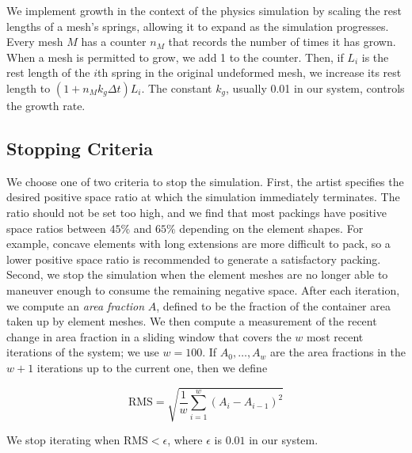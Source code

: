 We implement growth in the context of the physics simulation by scaling
the rest lengths of a mesh's springs, allowing it to expand as the simulation
progresses.  Every mesh $M$ has a counter $n_M$ that records the number of
times it has grown.  When a mesh is permitted
to grow, we add 1 to the counter.  Then, if $L_i$ is the rest length
of the $i$th spring in the original undeformed mesh, we increase its rest
length to $(1+n_Mk_g\Delta t)L_i$.  The constant $k_g$,
usually 0.01 in our system, controls the growth rate.


\subsection{Stopping Criteria}
\label{repulsionpak_stopping_criteria}


We choose one of two criteria to stop the simulation. First, the artist specifies 
the desired positive space ratio at which the simulation immediately terminates.
The ratio should not be set too high, and
we find that most packings have positive space ratios between $45\%$ and $65\%$ depending on the element shapes.
For example, concave elements with long extensions are more difficult to pack, 
so a lower positive space ratio is recommended to generate a satisfactory packing.
Second, we stop the simulation when the element meshes are no longer
able to maneuver enough to consume the remaining negative space. 
After each iteration, we compute an \textit{area fraction} $A$, defined to be the fraction of
the container area taken up by element meshes.  We then compute a measurement
of the recent change in area fraction in a sliding window that covers the $w$
most recent iterations of the system; we use $w=100$.  If $A_0,\ldots,A_w$
are the area fractions in the $w+1$ iterations up to the current one, then we
define

\begin{equation}
\mathrm{RMS} = \sqrt{ \frac{1}{w}\sum_{ i = 1 }^{w} { (A_i - A_{i-1}) }^2}
\end{equation}

We stop iterating when $\mathrm{RMS} < \epsilon$, where $\epsilon$ is $0.01$
in our system.

